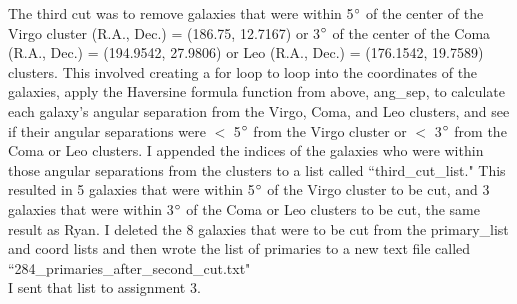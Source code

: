 \documentclass[10pt,letterpaper]{article}
\begin{document}
The third cut was to remove galaxies that were within 5$\degree$ of the center of the Virgo cluster (R.A., Dec.) = (186.75, 12.7167) or 3$\degree$ of the center of the Coma (R.A., Dec.) = (194.9542, 27.9806) or Leo (R.A., Dec.) = (176.1542, 19.7589) clusters. This involved creating a for loop to loop into the coordinates of the galaxies, apply the Haversine formula function from above, ang\_sep, to calculate each galaxy's angular separation from the Virgo, Coma, and Leo clusters, and see if their angular separations were $<$ 5$\degree$ from the Virgo cluster or $<$ 3$\degree$ from the Coma or Leo clusters. I appended the indices of the galaxies who were within those angular separations from the clusters to a list called ``third\_cut\_list." This resulted in 5 galaxies that were within 5$\degree$ of the Virgo cluster to be cut, and 3 galaxies that were within 3$\degree$ of the Coma or Leo clusters to be cut, the same result as Ryan. I deleted the 8 galaxies that were to be cut from the primary\_list and coord lists and then wrote the list of primaries to a new text file called ``284\_primaries\_after\_second\_cut.txt"\\

I sent that list to assignment 3.\\
\end{document}
